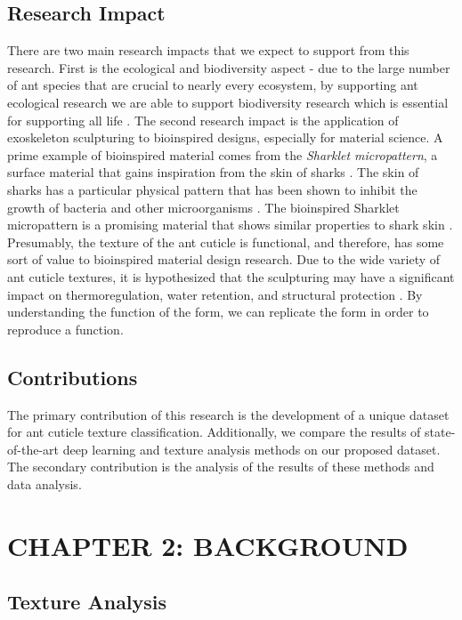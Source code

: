 \documentclass[12pt]{article}
\begin{document}
\subsection{Research Impact}

There are two main research impacts that we expect to support from this
research. First is the ecological and biodiversity aspect - due to the large
number of ant species that are crucial to nearly every ecosystem, by supporting
ant ecological research we are able to support biodiversity research which is
essential for supporting all life \cite{pongsiri_examining_2007}. The second
research impact is the application of exoskeleton sculpturing to bioinspired
designs, especially for material science. A prime example of bioinspired
material comes from the \textit{Sharklet micropattern}, a surface material that
gains inspiration from the skin of sharks \cite{cooper_engineered_2011}. The
skin of sharks has a particular physical pattern that has been shown to inhibit
the growth of bacteria and other microorganisms \cite{cooper_engineered_2011}.
The bioinspired Sharklet micropattern is a promising material that shows similar
properties to shark skin \cite{mann_surface_2014}. Presumably, the texture of
the ant cuticle is functional, and therefore, has some sort of value to
bioinspired material design research. Due to the wide variety of ant cuticle
textures, it is hypothesized that the sculpturing may have a significant impact
on thermoregulation, water retention, and structural protection
\cite{james_cross_2021}. By understanding the function of the form, we can
replicate the form in order to reproduce a function.

\subsection{Contributions}

The primary contribution of this research is the development of a unique dataset
for ant cuticle texture classification. Additionally, we compare the results of
state-of-the-art deep learning and texture analysis methods on our proposed
dataset. The secondary contribution is the analysis of the results of these
methods and data analysis.
\clearpage
\section{CHAPTER 2: BACKGROUND}

\subsection{Texture Analysis}
\end{document}
